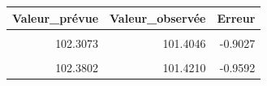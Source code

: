 \centering
\centering
\begin{tabular}[t]{rrr}
\toprule
Valeur\_prévue & Valeur\_observée & Erreur\\
\midrule
\cellcolor{gray!10}{102.3268} & \cellcolor{gray!10}{101.3877} & \cellcolor{gray!10}{-0.9391}\\
102.3073 & 101.4046 & -0.9027\\
\cellcolor{gray!10}{102.2141} & \cellcolor{gray!10}{101.4046} & \cellcolor{gray!10}{-0.8095}\\
102.3802 & 101.4210 & -0.9592\\
\bottomrule
\end{tabular}

